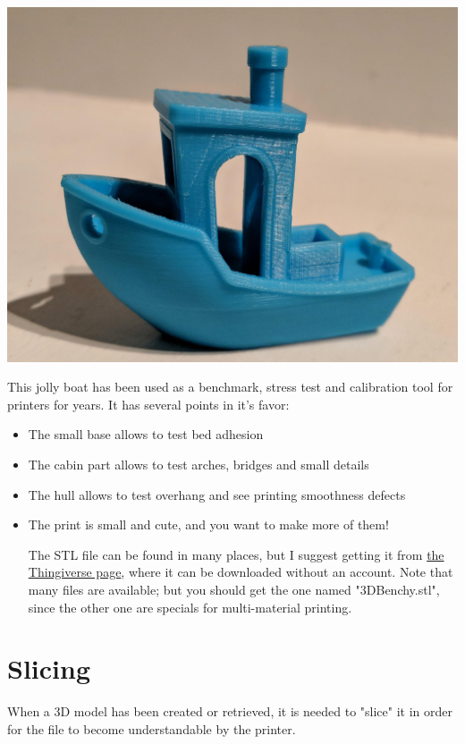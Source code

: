 \documentclass[a4paper,11pt]{article}
\begin{document}
\begin{center}
\includegraphics[width=.9\linewidth]{img/benchy.jpg}
\end{center}

This jolly boat has been used as a benchmark, stress test and calibration tool for printers for years. It has several
points in it's favor:
\begin{itemize}
\item The small base allows to test bed adhesion
\item The cabin part allows to test arches, bridges and small details
\item The hull allows to test overhang and see printing smoothness defects
\item The print is small and cute, and you want to make more of them!

The STL file can be found in many places, but I suggest getting it from \href{https://www.thingiverse.com/thing:763622/files}{the Thingiverse page},
where it can be downloaded without an account.
Note that many files are available; but you should get the one named "3DBenchy.stl",
since the other one are specials for multi-material printing.
\end{itemize}

\section{Slicing}
\label{sec:org1941b78}
When a 3D model has been created or retrieved, it is needed to "slice" it in order for the file to become
understandable by the printer.
\end{document}
